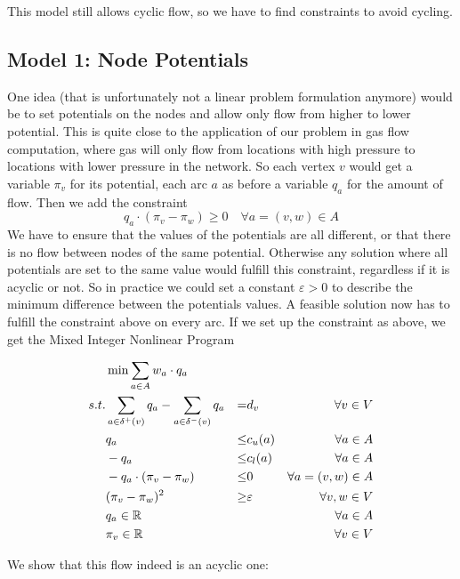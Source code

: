 This model still allows cyclic flow, so we have to find constraints to avoid cycling. 
\subsection{Model 1: Node Potentials}
\label{model:nodePotential}

One idea (that is unfortunately not a linear problem formulation anymore) would be to set potentials on the nodes and 
allow only flow from higher to lower potential. This is quite close to the application of our problem in gas flow 
computation, where gas will only flow from locations with high pressure to locations with lower pressure in the 
network. So 
each vertex $v$ would get a variable $\pi_v$ for its potential, each arc $a$ as before a variable $q_a$ for the amount 
of flow. Then we add the constraint $$q_a\cdot (\pi_v -\pi_w)\ge 0\quad\forall a=(v,w)\in A $$
We have to ensure that the values of the potentials are all 
different, or that there is no flow between nodes of the same potential. Otherwise any solution where all potentials 
are set to the same value would fulfill this constraint, regardless if it is acyclic or not. So in practice we could 
set a constant $\varepsilon > 0$ to describe the minimum difference between the potentials values. A feasible 
solution now has to fulfill the constraint above on every arc. If we set up the constraint as above, we get the Mixed 
Integer Nonlinear Program

\begin{align*}\label{model:nodePotentialQuadratic}
  &\min \sum_{a\in A} w_a\cdot q_a & \\
 s.t. & \sum_{a\in \delta^+(v)}q_a - \sum_{a\in\delta^- (v)}q_a &=& d_v &\forall v\in V \\
 & q_a &\le& c_u(a) & \forall a\in A\\
 & -q_a &\le& c_l(a) & \forall a\in A\\
 & -q_a\cdot (\pi_v -\pi_w)&\le& 0 &\forall a=(v,w)\in A\\
 & (\pi_v - \pi_w)^2 &\ge& \varepsilon &\forall v,w \in V\\
 & q_a \in \mathbb{R} & & &\forall a\in A\\
 & \pi_v \in \mathbb{R} & & & \forall v\in V\\
\end{align*}

We show that this flow indeed is an acyclic one:

